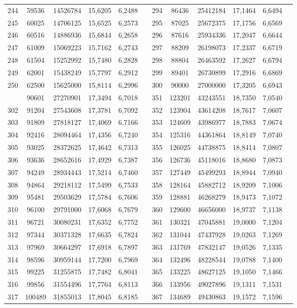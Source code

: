 \begin{longtable}{p{.17\linewidth}*{11}{S}}
244&59536&14526784&15,6205&6,2488&&294&86436&25412184&17,1464&6,6494\\
245&60025&14706125&15,6525&6,2573&&295&87025&25672375&17,1756&6,6569\\
246&60516&14886936&15,6844&6,2658&&296&87616&25934336&17,2047&6,6644\\
247&61009&15069223&15,7162&6,2743&&297&88209&26198073&17,2337&6,6719\\
248&61504&15252992&15,7480&6,2828&&298&88804&26463592&17,2627&6,6794\\
249&62001&15438249&15,7797&6,2912&&299&89401&26730899&17,2916&6,6869\\
250&62500&15625000&15,8114&6,2996&&300&90000&27000000&17,3205&6,6943\\
&90601&27270901&17,3494&6,7018&&351&123201&43243551&18,7350&7,0540\\
302&91204&27543608&17,3781&6,7092&&352&123904&43614208&18,7617&7,0607\\
303&91809&27818127&17,4069&6,7166&&353&124609&43986977&18,7883&7,0674\\
304&92416&28094464&17,4356&6,7240&&354&125316&44361864&18,8149&7,0740\\
305&93025&28372625&17,4642&6,7313&&355&126025&44738875&18,8414&7,0807\\
306&93636&28652616&17,4929&6,7387&&356&126736&45118016&18,8680&7,0873\\
307&94249&28934443&17,5214&6,7460&&357&127449&45499293&18,8944&7,0940\\
308&94864&29218112&17,5499&6,7533&&358&128164&45882712&18,9209&7,1006\\
309&95481&29503629&17,5784&6,7606&&359&128881&46268279&18,9473&7,1072\\
310&96100&29791000&17,6068&6,7679&&360&129600&46656000&18,9737&7,1138\\
311&96721&30080231&17,6352&6,7752&&361&130321&47045881&19,0000&7,1204\\
312&97344&30371328&17,6635&6,7824&&362&131044&47437928&19,0263&7,1269\\
313&97969&30664297&17,6918&6,7897&&363&131769&47832147&19,0526&7,1335\\
314&98596&30959144&17,7200&6,7969&&364&132496&48228544&19,0788&7,1400\\
315&99225&31255875&17,7482&6,8041&&365&133225&48627125&19,1050&7,1466\\
316&99856&31554496&17,7764&6,8113&&366&133956&49027896&19,1311&7,1531\\
317&100489&31855013&17,8045&6,8185&&367&134689&49430863&19,1572&7,1596\\

\end{longtable}
